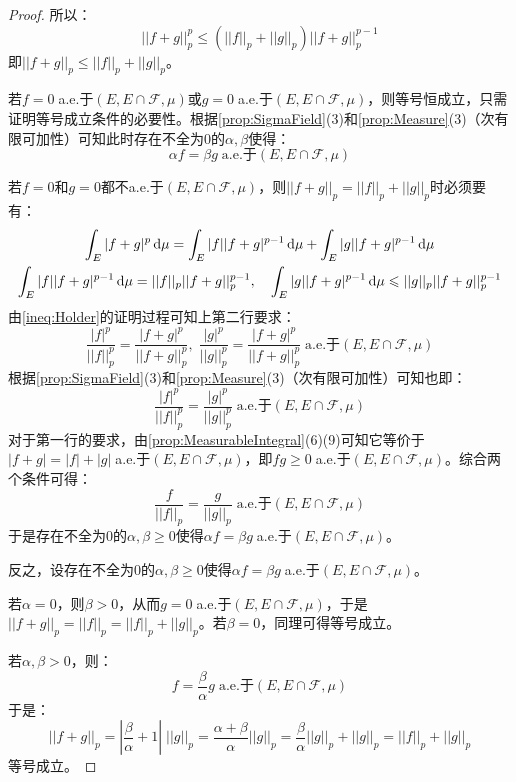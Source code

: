 \begin{proof}
	所以：
	\begin{equation*}
		||f+g||_p^p\leqslant\left(||f||_p+||g||_p\right)||f+g||_p^{p-1}
	\end{equation*}
	即$||f+g||_p\leqslant||f||_p+||g||_p$。\par
	若$f=0\;$a.e.于$(E,E\cap\mathscr{F},\mu)$或$g=0\;$a.e.于$(E,E\cap\mathscr{F},\mu)$，则等号恒成立，只需证明等号成立条件的必要性。根据\cref{prop:SigmaField}(3)和\cref{prop:Measure}(3)（次有限可加性）可知此时存在不全为$0$的$\alpha,\beta$使得：
	\begin{equation*}
		\alpha f=\beta g\;\text{a.e.于$(E,E\cap\mathscr{F},\mu)$}
	\end{equation*}\par
	若$f=0$和$g=0$都不a.e.于$(E,E\cap\mathscr{F},\mu)$，则$||f+g||_p=||f||_p+||g||_p$时必须要有：
	\begin{gather*}
		\int_{E}|f+g|^p\mathop{}\!\mathrm{d}\mu=\int_{E}|f||f+g|^{p-1}\mathop{}\!\mathrm{d}\mu+\int_{E}|g||f+g|^{p-1}\mathop{}\!\mathrm{d}\mu \\
		\int_{E}|f||f+g|^{p-1}\mathop{}\!\mathrm{d}\mu=||f||_p||f+g||_p^{p-1},\quad\int_{E}|g||f+g|^{p-1}\mathop{}\!\mathrm{d}\mu\leqslant||g||_p||f+g||_p^{p-1}
	\end{gather*}
	由\cref{ineq:Holder}的证明过程可知上第二行要求：
	\begin{equation*}
		\frac{|f|^p}{||f||_p^p}=\frac{|f+g|^p}{||f+g||_p^p},\;\frac{|g|^p}{||g||_p^p}=\frac{|f+g|^p}{||f+g||_p^p}\;\text{a.e.于$(E,E\cap\mathscr{F},\mu)$}
	\end{equation*}
	根据\cref{prop:SigmaField}(3)和\cref{prop:Measure}(3)（次有限可加性）可知也即：
	\begin{equation*}
		\frac{|f|^p}{||f||_p^p}=\frac{|g|^p}{||g||_p^p}\;\text{a.e.于$(E,E\cap\mathscr{F},\mu)$}
	\end{equation*}
	对于第一行的要求，由\cref{prop:MeasurableIntegral}(6)(9)可知它等价于$|f+g|=|f|+|g|\;$a.e.于$(E,E\cap\mathscr{F},\mu)$，即$fg\geqslant0\;$a.e.于$(E,E\cap\mathscr{F},\mu)$。综合两个条件可得：
	\begin{equation*}
		\frac{f}{||f||_p}=\frac{g}{||g||_p}\;\text{a.e.于$(E,E\cap\mathscr{F},\mu)$}
	\end{equation*}
	于是存在不全为$0$的$\alpha,\beta\geqslant0$使得$\alpha f=\beta g\;$a.e.于$(E,E\cap\mathscr{F},\mu)$。\par
	反之，设存在不全为$0$的$\alpha,\beta\geqslant0$使得$\alpha f=\beta g\;$a.e.于$(E,E\cap\mathscr{F},\mu)$。\par
	若$\alpha=0$，则$\beta>0$，从而$g=0\;$a.e.于$(E,E\cap\mathscr{F},\mu)$，于是$||f+g||_p=||f||_p=||f||_p+||g||_p$。若$\beta=0$，同理可得等号成立。\par
	若$\alpha,\beta>0$，则：
	\begin{equation*}
		f=\frac{\beta}{\alpha}g\;\text{a.e.于$(E,E\cap\mathscr{F},\mu)$}
	\end{equation*}
	于是：
	\begin{equation*}
		||f+g||_p=\left|\frac{\beta}{\alpha}+1\right|\;||g||_p=\frac{\alpha+\beta}{\alpha}||g||_p=\frac{\beta}{\alpha}||g||_p+||g||_p=||f||_p+||g||_p
	\end{equation*}
	等号成立。
\end{proof}
